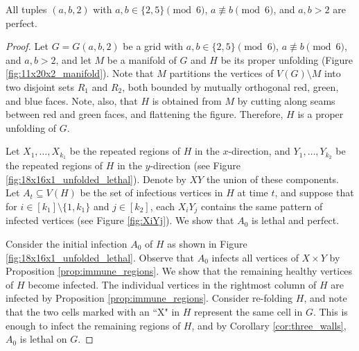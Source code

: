 
\begin{con}
\label{con:2x2x5_mod6}
All tuples $(a,b,2)$ with $a,b \in \{2,5\} \pmod 6$, $a \not\equiv b \pmod 6$, and $a,b > 2$ are perfect. 
\end{con}

\begin{proof}
Let $G=G(a,b,2)$ be a grid with $a,b \in \{2,5\} \pmod 6$, $a \not\equiv b \pmod 6$, and $a,b > 2$, and let $M$ be a manifold of $G$ and $H$ be its proper unfolding (Figure \ref{fig:11x20x2_manifold}). Note that $M$ partitions the vertices of $V(G) \setminus M$ into two disjoint sets $R_1$ and $R_2$, both bounded by mutually orthogonal red, green, and blue faces. Note, also, that $H$ is obtained from $M$ by cutting along seams between red and green faces, and flattening the figure. Therefore, $H$ is a proper unfolding of $G$. 

Let $X_1, \dots, X_{k_1}$ be the repeated regions of $H$ in the $x$-direction, and $Y_1, \dots, Y_{k_2}$ be the repeated regions of $H$ in the $y$-direction (see Figure \ref{fig:18x16x1_unfolded_lethal}). Denote by $XY$ the union of these components. Let $A_t \subseteq V(H)$ be the set of infectious vertices in $H$ at time $t$, and suppose that for $i \in [k_1] \setminus \{1,k_1\}$ and $j \in [k_2]$, each $X_iY_j$ contains the same pattern of infected vertices (see Figure \ref{fig:XiYj}). We show that $A_0$ is lethal and perfect.

Consider the initial infection $A_0$ of $H$ as shown in Figure \ref{fig:18x16x1_unfolded_lethal}. Observe that $A_0$ infects all vertices of $X\times Y$ by Proposition \ref{prop:immune_regions}. We show that the remaining healthy vertices of $H$ become infected. The individual vertices in the rightmost column of $H$ are infected by Proposition \ref{prop:immune_regions}. Consider re-folding $H$, and note that the two cells marked with an ``X" in $H$ represent the same cell in $G$. This is enough to infect the remaining regions of $H$, and by Corollary \ref{cor:three_walls}, $A_0$ is lethal on $G$. 


\end{proof}
